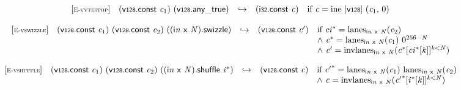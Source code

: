 \vspace{1ex}

$$
\begin{array}{@{}l@{}lcl@{}l@{}}
{[\textsc{\scriptsize E{-}vvtestop}]} \quad & (\mathsf{v{\scriptstyle128}}.\mathsf{const}~{\mathit{c}}_{{1}})~(\mathsf{v{\scriptstyle128}} . \mathsf{any\_true}) &\hookrightarrow& (\mathsf{i{\scriptstyle32}}.\mathsf{const}~{\mathit{c}}) &\quad
  \mbox{if}~{\mathit{c}} = {\mathrm{ine}}~{|\mathsf{v{\scriptstyle128}}|}~({\mathit{c}}_{{1}},\, 0) \\
\end{array}
$$

\vspace{1ex}

$$
\begin{array}{@{}l@{}lcl@{}l@{}}
{[\textsc{\scriptsize E{-}vswizzle}]} \quad & (\mathsf{v{\scriptstyle128}}.\mathsf{const}~{\mathit{c}}_{{1}})~(\mathsf{v{\scriptstyle128}}.\mathsf{const}~{\mathit{c}}_{{2}})~(({\mathsf{i}}{{\mathit{n}}}~\mathsf{x}~{\mathit{N}}).\mathsf{swizzle}) &\hookrightarrow& (\mathsf{v{\scriptstyle128}}.\mathsf{const}~{\mathit{c}'}) &\quad
  \mbox{if}~{{\mathit{ci}}^\ast} = {{\mathrm{lanes}}}_{{\mathsf{i}}{{\mathit{n}}}~\mathsf{x}~{\mathit{N}}}({\mathit{c}}_{{2}}) \\
 &&&&\quad {\land}~{{\mathit{c}}^\ast} = {{\mathrm{lanes}}}_{{\mathsf{i}}{{\mathit{n}}}~\mathsf{x}~{\mathit{N}}}({\mathit{c}}_{{1}})~{0^{256 - {\mathit{N}}}} \\
 &&&&\quad {\land}~{\mathit{c}'} = {{\mathrm{invlanes}}}_{{\mathsf{i}}{{\mathit{n}}}~\mathsf{x}~{\mathit{N}}}({{{\mathit{c}}^\ast}{}[{{\mathit{ci}}^\ast}{}[{\mathit{k}}]]^{{\mathit{k}}<{\mathit{N}}}}) \\
\end{array}
$$

\vspace{1ex}

$$
\begin{array}{@{}l@{}lcl@{}l@{}}
{[\textsc{\scriptsize E{-}vshuffle}]} \quad & (\mathsf{v{\scriptstyle128}}.\mathsf{const}~{\mathit{c}}_{{1}})~(\mathsf{v{\scriptstyle128}}.\mathsf{const}~{\mathit{c}}_{{2}})~(({\mathsf{i}}{{\mathit{n}}}~\mathsf{x}~{\mathit{N}}).\mathsf{shuffle}~{{\mathit{i}}^\ast}) &\hookrightarrow& (\mathsf{v{\scriptstyle128}}.\mathsf{const}~{\mathit{c}}) &\quad
  \mbox{if}~{{\mathit{c}'}^\ast} = {{\mathrm{lanes}}}_{{\mathsf{i}}{{\mathit{n}}}~\mathsf{x}~{\mathit{N}}}({\mathit{c}}_{{1}})~{{\mathrm{lanes}}}_{{\mathsf{i}}{{\mathit{n}}}~\mathsf{x}~{\mathit{N}}}({\mathit{c}}_{{2}}) \\
 &&&&\quad {\land}~{\mathit{c}} = {{\mathrm{invlanes}}}_{{\mathsf{i}}{{\mathit{n}}}~\mathsf{x}~{\mathit{N}}}({{{\mathit{c}'}^\ast}{}[{{\mathit{i}}^\ast}{}[{\mathit{k}}]]^{{\mathit{k}}<{\mathit{N}}}}) \\
\end{array}
$$

